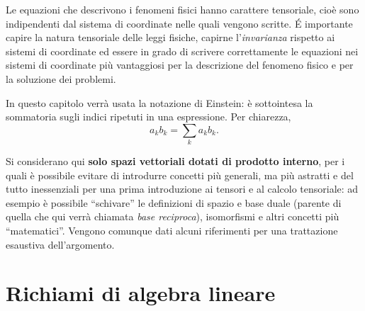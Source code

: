 

Le equazioni che descrivono i fenomeni fisici hanno carattere tensoriale,
 cioè sono indipendenti dal sistema di coordinate nelle quali vengono scritte.
\'E importante capire la natura tensoriale delle leggi fisiche, capirne
 l'\textit{invarianza} rispetto ai sistemi di coordinate ed essere in grado di
 scrivere correttamente le equazioni nei sistemi di coordinate più vantaggiosi
 per la descrizione del fenomeno fisico e per la soluzione dei problemi.

\vspace{0.2cm}
In questo capitolo verrà usata la notazione di Einstein: è sottointesa la sommatoria
 sugli indici ripetuti in una espressione. Per chiarezza,
\begin{equation}
 a_k b_k = \displaystyle\sum_k a_k b_k .
\end{equation}

Si considerano qui \textbf{solo spazi vettoriali dotati di 
 prodotto interno}, per i quali è possibile evitare di introdurre concetti
 più generali, ma più astratti e del tutto inessenziali per una prima
 introduzione ai tensori e al calcolo tensoriale: ad esempio è possibile
 ``schivare'' le definizioni di spazio e base duale (parente di quella che qui
 verrà chiamata \textit{base reciproca}), isomorfismi e altri concetti più
 ``matematici''. Vengono comunque dati alcuni riferimenti per una trattazione esaustiva
 dell'argomento. 

\section{Richiami di algebra lineare}

